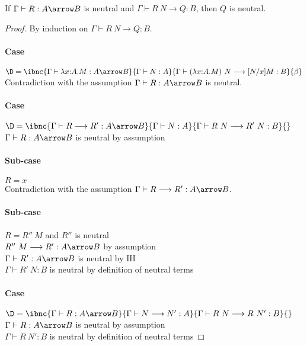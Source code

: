 \documentclass{article}
\newcommand{\red}{\longrightarrow}
\begin{document}
\begin{lemma}\label{lm:neu-step}
If $\Gamma \vdash R : A \arrow B$ is neutral and $\Gamma \vdash R~N
\red Q : B$, then $Q$ is neutral.
\end{lemma}
\begin{proof}
By induction on $\Gamma \vdash R~N \red Q : B$.

\paragraph{Case}
$\D = \ibnc {\Gamma \vdash \lambda x{:}A.M : A \arrow B}
	          {\Gamma \vdash  N : A}
            {\Gamma \vdash (\lambda x{:}A.M)~N  \red [N/x]M : B }{\beta}$
\\
Contradiction with the assumption $\Gamma \vdash R : A \arrow B$ is neutral.

\paragraph{Case}
$\D = \ibnc {\Gamma \vdash R \red R' : A \arrow B}
	          {\Gamma \vdash N : A}
            {\Gamma \vdash R~N \red R'~N : B}{}$
\\
$\Gamma \vdash R : A \arrow B$ is neutral \hfill by assumption

\paragraph{Sub-case} $R = x$ \\
Contradiction with the assumption $\Gamma \vdash R \red R' : A \arrow B$.

\paragraph{Sub-case} $R = R''~M$ and $R''$ is neutral \\
$R''~M \red R' : A \arrow B$ \hfill by assumption \\
$\Gamma \vdash R' : A \arrow B$ is neutral \hfill by IH \\
$\Gamma \vdash R'~N : B$ is neutral \hfill by definition of neutral terms

\paragraph{Case}
$\D = \ibnc {\Gamma \vdash R : A \arrow B}
	          {\Gamma \vdash N \red N' : A}
            {\Gamma \vdash R~N \red R~N' : B}{}$
\\
$\Gamma \vdash R : A \arrow B$ is neutral \hfill by assumption \\
$\Gamma \vdash R~N' : B$ is neutral \hfill by definition of neutral terms

\end{proof}
\end{document}
